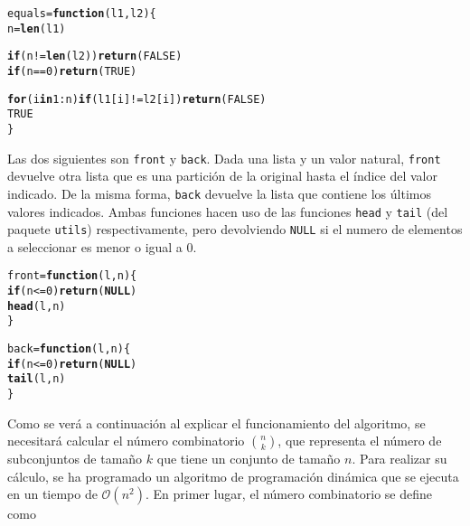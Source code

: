 \documentclass[12pt]{report}\usepackage[]{graphicx}\usepackage[dvipsnames]{xcolor}
\makeatletter
\newcommand{\hlnum}[1]{\textcolor[rgb]{0.686,0.059,0.569}{#1}}%
\newcommand{\hlopt}[1]{\textcolor[rgb]{0,0,0}{#1}}%
\newcommand{\hlstd}[1]{\textcolor[rgb]{0.345,0.345,0.345}{#1}}%
\newcommand{\hlkwa}[1]{\textcolor[rgb]{0.161,0.373,0.58}{\textbf{#1}}}%
\newcommand{\hlkwb}[1]{\textcolor[rgb]{0.69,0.353,0.396}{#1}}%
\newcommand{\hlkwc}[1]{\textcolor[rgb]{0.333,0.667,0.333}{#1}}%
\newcommand{\hlkwd}[1]{\textcolor[rgb]{0.737,0.353,0.396}{\textbf{#1}}}%
\newenvironment{kframe}{%
 \def\at@end@of@kframe{}%
 \ifinner\ifhmode%
  \def\at@end@of@kframe{\end{minipage}}%
  \begin{minipage}{\columnwidth}%
 \fi\fi%
 \def\FrameCommand##1{\hskip\@totalleftmargin \hskip-\fboxsep
 \colorbox{shadecolor}{##1}\hskip-\fboxsep
     \hskip-\linewidth \hskip-\@totalleftmargin \hskip\columnwidth}%
 \MakeFramed {\advance\hsize-\width
   \@totalleftmargin\z@ \linewidth\hsize
   \@setminipage}}%
 {\par\unskip\endMakeFramed%
 \at@end@of@kframe}
\newenvironment{knitrout}{}{} %
\makeatother
\begin{document}
\begin{knitrout}
\color{fgcolor}\begin{kframe}
\begin{alltt}
\hlstd{equals} \hlkwb{=} \hlkwa{function}\hlstd{(}\hlkwc{l1}\hlstd{,} \hlkwc{l2}\hlstd{) \{}
        \hlstd{n} \hlkwb{=} \hlkwd{len}\hlstd{(l1)}

        \hlkwa{if} \hlstd{(n} \hlopt{!=} \hlkwd{len}\hlstd{(l2))} \hlkwd{return}\hlstd{(}\hlnum{FALSE}\hlstd{)}
        \hlkwa{if} \hlstd{(n}\hlopt{==}\hlnum{0}\hlstd{)} \hlkwd{return}\hlstd{(}\hlnum{TRUE}\hlstd{)}

        \hlkwa{for} \hlstd{(i} \hlkwa{in} \hlnum{1}\hlopt{:}\hlstd{n)} \hlkwa{if} \hlstd{(l1[i]} \hlopt{!=} \hlstd{l2[i])} \hlkwd{return}\hlstd{(}\hlnum{FALSE}\hlstd{)}
        \hlnum{TRUE}
\hlstd{\}}
\end{alltt}
\end{kframe}
\end{knitrout}
			
			Las dos siguientes son \texttt{front} y \texttt{back}. Dada una lista y un valor natural, \texttt{front} devuelve otra lista que es una partición de la original hasta el índice del valor indicado. De la misma forma, \texttt{back} devuelve la lista que contiene los últimos valores indicados. Ambas funciones hacen uso de las funciones \texttt{head} y \texttt{tail} (del paquete \texttt{utils}) respectivamente, pero devolviendo \texttt{NULL} si el numero de elementos a seleccionar es menor o igual a 0.
			
\begin{knitrout}
\color{fgcolor}\begin{kframe}
\begin{alltt}
\hlstd{front} \hlkwb{=} \hlkwa{function}\hlstd{(}\hlkwc{l}\hlstd{,} \hlkwc{n}\hlstd{) \{}
        \hlkwa{if} \hlstd{(n} \hlopt{<=} \hlnum{0}\hlstd{)} \hlkwd{return}\hlstd{(}\hlkwa{NULL}\hlstd{)}
        \hlkwd{head}\hlstd{(l, n)}
\hlstd{\}}

\hlstd{back} \hlkwb{=} \hlkwa{function}\hlstd{(}\hlkwc{l}\hlstd{,} \hlkwc{n}\hlstd{) \{}
        \hlkwa{if} \hlstd{(n} \hlopt{<=} \hlnum{0}\hlstd{)} \hlkwd{return}\hlstd{(}\hlkwa{NULL}\hlstd{)}
        \hlkwd{tail}\hlstd{(l, n)}
\hlstd{\}}
\end{alltt}
\end{kframe}
\end{knitrout}
			
			Como se verá a continuación al explicar el funcionamiento del algoritmo, se necesitará calcular el número combinatorio $\binom{n}{k}$, que representa el número de subconjuntos de tamaño $k$ que tiene un conjunto de tamaño $n$. Para realizar su cálculo, se ha programado un algoritmo de programación dinámica que se ejecuta en un tiempo de $\mathcal{O}(n^2)$. En primer lugar, el número combinatorio se define como
			
\end{document}
